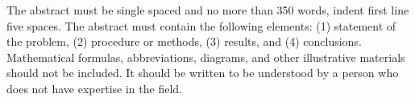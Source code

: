 
\begin{singlespaced}

The abstract must be single spaced and no more than 350 words, indent first line five spaces. The abstract must contain the following elements: (1) statement of the problem, (2) procedure or methods, (3) results, and (4) conclusions. Mathematical formulas, abbreviations, diagrams, and other illustrative materials should not be included. It should be written to be understood by a person who does not have expertise in the field.

\end{singlespaced}

